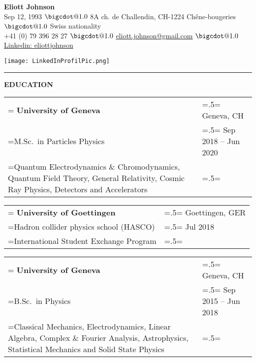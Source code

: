 \documentclass[letterpaper, 11pt]{article}
\makeatletter
\newcommand*\bigcdot{\mathpalette\bigcdot@{1.0}}
\newcommand*\bigcdot@[2]{\mathbin{\vcenter{\hbox{\scalebox{#2}{$\m@th#1\bullet$}}}}}
\makeatother
\begin{document}
\setlength\parindent{0pt}\textbf{}

\hfill%
\begin{minipage}{0.79\textwidth}\flushleft
\huge{\bf{Eliott Johnson}}\\
\normalsize
Sep 12, 1993 $\bigcdot$ 8A ch. de Challendin, CH-1224 Chêne-bougeries $\bigcdot$ Swiss nationality \\
+41 (0) 79 396 28 27 $\bigcdot$  \href{mailto:eliott.johnson@gmail.com}{eliott.johnson@gmail.com} $\bigcdot$  \href{https://www.linkedin.com/in/eliottjohnson/}{Linkedin: eliottjohnson}
\end{minipage}
\begin{minipage}{0.19\textwidth}%
\texttt{[image: LinkedInProfilPic.png]}
\end{minipage}%
\vspace{0.25cm}

\noindent\rule{\textwidth}{1pt}

\begin{center}
\large\bf{EDUCATION}
\end{center}

\begin{tabularx}{1.0\textwidth} { 
   >{\raggedright\arraybackslash\hsize=1.5\hsize\linewidth=\hsize}X 
   >{\raggedleft\arraybackslash\hsize=.5\hsize\linewidth=\hsize}X }
\normalsize
\bf{University of Geneva} & Geneva, CH \\
\normalfont M.Sc.\ in Particles Physics & Sep 2018 -- Jun 2020  \\  
Quantum Electrodynamics \& Chromodynamics, Quantum Field Theory, General Relativity, Cosmic Ray Physics, Detectors and Accelerators &
\end{tabularx}
\vspace{0.25cm}

\begin{tabularx}{1.0\textwidth} { 
   >{\raggedright\arraybackslash\hsize=1.5\hsize\linewidth=\hsize}X 
   >{\raggedleft\arraybackslash\hsize=.5\hsize\linewidth=\hsize}X }
\normalsize
\bf{University of Goettingen} & Goettingen, GER \\
\normalfont Hadron collider physics school (HASCO) & Jul 2018 \\
International Student Exchange Program
\end{tabularx}
\vspace{0.25cm}

\begin{tabularx}{1.0\textwidth} { 
   >{\raggedright\arraybackslash\hsize=1.5\hsize\linewidth=\hsize}X 
   >{\raggedleft\arraybackslash\hsize=.5\hsize\linewidth=\hsize}X }
\normalsize
\bf{University of Geneva} & Geneva, CH \\
\normalfont B.Sc.\ in Physics & Sep 2015 -- Jun 2018  \\  
Classical Mechanics, Electrodynamics, Linear Algebra, Complex \& Fourier Analysis, Astrophysics, Statistical Mechanics and Solid State Physics &
\end{tabularx}
\vspace{0.25cm}
\end{document}
